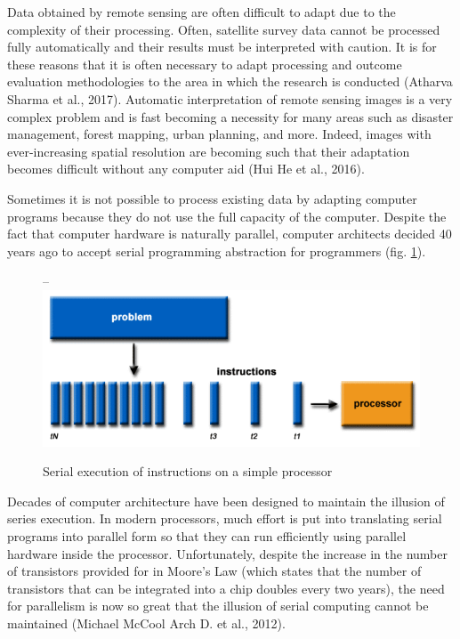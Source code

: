 {{	Data obtained by remote sensing are often difficult to adapt due to the complexity of their processing. Often, satellite survey data cannot be processed fully automatically and their results must be interpreted with caution. It is for these reasons that it is often necessary to adapt processing and outcome evaluation methodologies to the area in which the research is conducted (Atharva Sharma et al., 2017).
	Automatic interpretation of remote sensing images is a very complex problem and is fast becoming a necessity for many areas such as disaster management, forest mapping, urban planning, and more. Indeed, images with ever-increasing spatial resolution are becoming such that their adaptation becomes difficult without any computer aid (Hui He et al., 2016).
	
	Sometimes it is not possible to process existing data by adapting computer programs because they do not use the full capacity of the computer. Despite the fact that computer hardware is naturally parallel, computer architects decided 40 years ago to accept serial programming abstraction for programmers (fig. \ref{fig:seq_exec}).
	
	\begin{figure}[H]
		\centering
--		\includegraphics[width=0.9\linewidth]{images/seq_exec.png}
		\caption{Serial execution of instructions on a simple processor}
		\label{fig:seq_exec}
	\end{figure}

	Decades of computer architecture have been designed to maintain the illusion of series execution. In modern processors, much effort is put into translating serial programs into parallel form so that they can run efficiently using parallel hardware inside the processor. Unfortunately, despite the increase in the number of transistors provided for in Moore's Law (which states that the number of transistors that can be integrated into a chip doubles every two years), the need for parallelism is now so great that the illusion of serial computing cannot be maintained (Michael McCool Arch D. et al., 2012).
	
}}
